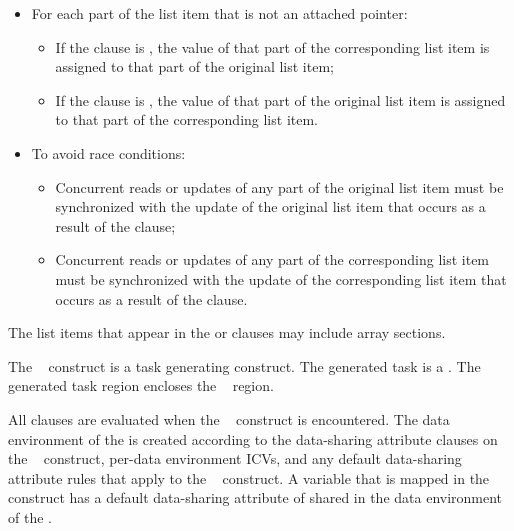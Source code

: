 \begin{samepage}
\begin{itemize}
\begin{itemize}
   \end{itemize}

    \item For each part of the list item that is not an attached pointer: \begin{itemize}

        \item If the clause is , the value of that part of the
        corresponding list item is assigned to that part of the original list
       item; 

        \item If the clause is , the value of that part of the
        original list item is assigned to that part of the corresponding list
        item. 

   \end{itemize}

   \item To avoid race conditions: \begin{itemize}

        \item Concurrent reads or updates of any part
        of the original list item must be synchronized with the update of the
        original list item that occurs as a result of the  clause;

        \item Concurrent reads or updates of any part
        of the corresponding list item must be synchronized with the update of the
        corresponding list item that occurs as a result of the  clause.

   \end{itemize}

\end{itemize}

\end{samepage}

The list items that appear in the  or  clauses may include array sections.

The ~ construct is a task generating construct.  The generated task is a .  The generated task region encloses the ~ region.

All clauses are evaluated when the ~ construct is encountered.  The data environment of the  is created according to the data-sharing attribute clauses on the ~ construct, per-data environment ICVs, and any default data-sharing attribute rules that apply to the ~ construct.  A variable that is mapped in the ~ construct has a default data-sharing attribute of shared in the data environment of the .

